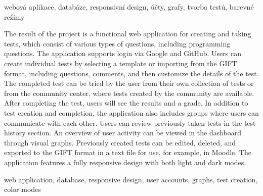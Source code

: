 \documentclass[12pt, a4paper,
openright
]{report}
\begin{document}
	\vspace{18pt}
	
	
	\noindent webová aplikace, databáze, responsivní design, účty, grafy, tvorba testů, barevné režimy
	
	\vspace{18pt}


	
	\clearpage %
	\noindent The result of the project is a functional web application for creating and taking tests, which consist of various types of questions, including programming questions. The application supports login via Google and GitHub. Users can create individual tests by selecting a template or importing from the GIFT format, including questions, comments, and then customize the details of the test. The completed test can be tried by the user from their own collection of tests or from the community center, where tests created by the community are available. After completing the test, users will see the results and a grade. In addition to test creation and completion, the application also includes groups where users can communicate with each other. Users can review previously taken tests in the test history section. An overview of user activity can be viewed in the dashboard through visual graphs. Previously created tests can be edited, deleted, and exported to the GIFT format in a text file for use, for example, in Moodle. The application features a fully responsive design with both light and dark modes.
	
	\vspace{18pt}
	
	
	\noindent web application, database, responsive design, user accounts, graphs, test creation, color modes
	
	\vspace{18pt}

	\cleardoublepage

	
	\tableofcontents %

	\setcounter{page}{1} %
\end{document}
